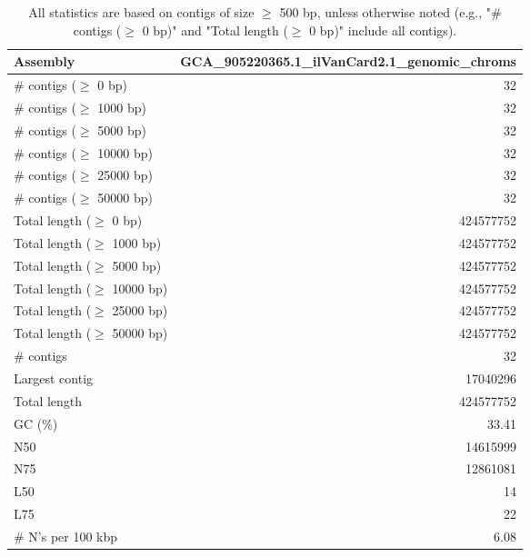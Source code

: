 \documentclass[12pt,a4paper]{article}
\begin{document}
\begin{table}[ht]
\begin{center}
\caption{All statistics are based on contigs of size $\geq$ 500 bp, unless otherwise noted (e.g., "\# contigs ($\geq$ 0 bp)" and "Total length ($\geq$ 0 bp)" include all contigs).}
\begin{tabular}{|l*{1}{|r}|}
\hline
Assembly & GCA\_905220365.1\_ilVanCard2.1\_genomic\_chroms \\ \hline
\# contigs ($\geq$ 0 bp) & 32 \\ \hline
\# contigs ($\geq$ 1000 bp) & 32 \\ \hline
\# contigs ($\geq$ 5000 bp) & 32 \\ \hline
\# contigs ($\geq$ 10000 bp) & 32 \\ \hline
\# contigs ($\geq$ 25000 bp) & 32 \\ \hline
\# contigs ($\geq$ 50000 bp) & 32 \\ \hline
Total length ($\geq$ 0 bp) & 424577752 \\ \hline
Total length ($\geq$ 1000 bp) & 424577752 \\ \hline
Total length ($\geq$ 5000 bp) & 424577752 \\ \hline
Total length ($\geq$ 10000 bp) & 424577752 \\ \hline
Total length ($\geq$ 25000 bp) & 424577752 \\ \hline
Total length ($\geq$ 50000 bp) & 424577752 \\ \hline
\# contigs & 32 \\ \hline
Largest contig & 17040296 \\ \hline
Total length & 424577752 \\ \hline
GC (\%) & 33.41 \\ \hline
N50 & 14615999 \\ \hline
N75 & 12861081 \\ \hline
L50 & 14 \\ \hline
L75 & 22 \\ \hline
\# N's per 100 kbp & 6.08 \\ \hline
\end{tabular}
\end{center}
\end{table}
\end{document}
